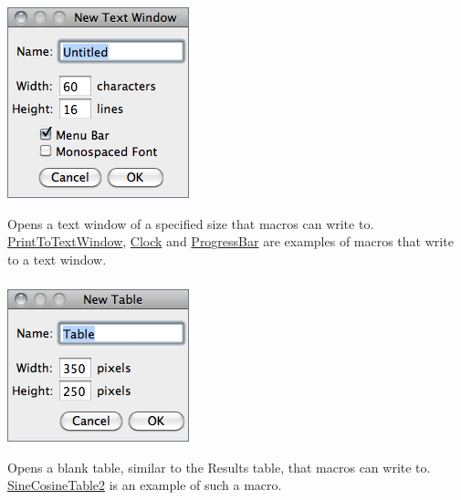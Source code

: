 \begin{minipage}[c][1\totalheight][t]{0.295\columnwidth}%
\includegraphics[scale=0.55]{images/NewTextWindow}%
\end{minipage}%
\begin{minipage}[c][1\totalheight][t]{0.705\columnwidth}%
Opens a text window of a specified size that macros can write to.
\href{http://imagej.nih.gov/ij/macros/PrintToTextWindow.txt}{PrintToTextWindow},
\href{http://imagej.nih.gov/ij/macros/Clock.txt}{Clock} and \href{http://imagej.nih.gov/ij/macros/ProgressBar.txt}{ProgressBar}
are examples of macros that write to a text window.


%
\end{minipage}


\subsubsection{\protect{}\label{sub:Table...}}

\begin{minipage}[c][1\totalheight][t]{0.295\columnwidth}%
\includegraphics[scale=0.55]{images/NewTable}%
\end{minipage}%
\begin{minipage}[c][1\totalheight][t]{0.705\columnwidth}%
Opens a blank table, similar to the Results table, that macros can
write to. \href{http://(/usr//imagej.nih.gov/ij/macros/SineCosineTable2.txt}{SineCosineTable2}
is an example of such a macro.


%
\end{minipage}


